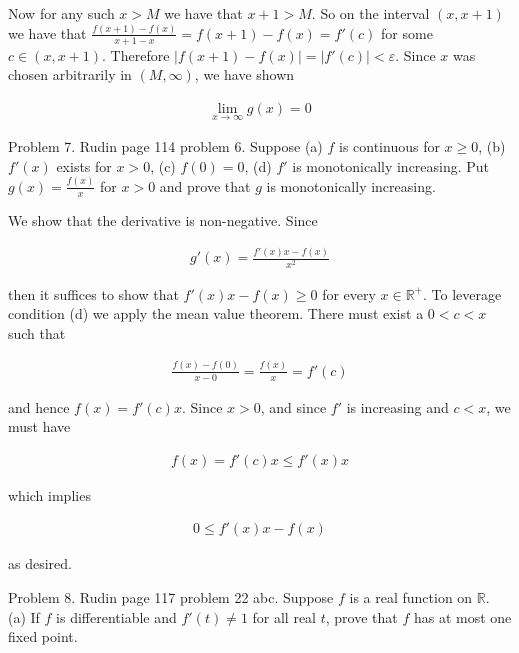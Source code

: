 \documentclass{article}
\begin{document}
  Now for any such $x>M$ we have that $x+1>M$.  So on the interval $(x,x+1)$ we have that $\frac{f(x+1)-f(x)}{x+1-x} = f(x+1)-f(x) = f'(c)$ for some $c\in (x,x+1)$.  Therefore $|f(x+1)-f(x)| = |f'(c)|<\varepsilon$.  Since $x$ was chosen arbitrarily in $(M,\infty)$, we have shown

  \begin{align*}
    \lim_{x\to \infty}g(x)=0
  \end{align*}

  \pagebreak

  {\Large \color{Sepia} Problem 7. Rudin page 114 problem 6. Suppose (a) $f$ is continuous for $x\geq 0$, (b) $f'(x)$ exists for $x>0$, (c) $f(0)=0$, (d) $f'$ is monotonically increasing.  Put $g(x)=\frac{f(x)}{x}$ for $x>0$ and prove that $g$ is monotonically increasing.}

  \vspace{1cm}

  We show that the derivative is non-negative.  Since

  \begin{align*}
    g'(x) = \frac{f'(x)x-f(x)}{x^2}
  \end{align*}

  then it suffices to show that $f'(x)x-f(x)\geq 0$ for every $x\in\mathbb R^+$.  To leverage condition (d) we apply the mean value theorem.  There must exist a $0 < c < x$ such that

  \begin{align*}
    \frac{f(x)-f(0)}{x-0} = \frac{f(x)}{x} = f'(c)
  \end{align*}

  and hence $f(x) = f'(c)x$.  Since $x > 0$, and since $f'$ is increasing and $c<x$, we must have

  \begin{align*}
    f(x) = f'(c)x \leq f'(x)x
  \end{align*}

  which implies

  \begin{align*}
    0\leq f'(x)x-f(x)
  \end{align*}

  as desired.

  \pagebreak

  {\Large \color{Sepia} Problem 8. Rudin page 117 problem 22 abc. Suppose $f$ is a real function on $\mathbb R$.  (a) If $f$ is differentiable and $f'(t)\ne 1$ for all real $t$, prove that $f$ has at most one fixed point.}
\end{document}

